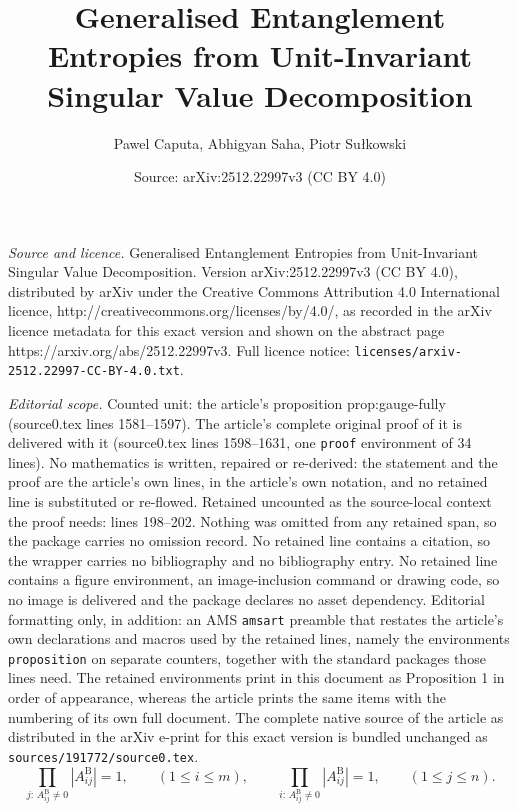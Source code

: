 \documentclass[10pt,a4paper]{amsart}
\title{Generalised Entanglement Entropies from Unit-Invariant Singular Value Decomposition}
\author{Pawel Caputa, Abhigyan Saha, Piotr Su{\l}kowski}
\date{Source: arXiv:2512.22997v3 (CC BY 4.0)}
\begin{document}
\maketitle

\noindent\emph{Source and licence.} Generalised Entanglement Entropies from Unit-Invariant Singular Value Decomposition. Version arXiv:2512.22997v3 (CC BY 4.0), distributed by arXiv under the Creative Commons Attribution 4.0 International licence, http://creativecommons.org/licenses/by/4.0/, as recorded in the arXiv licence metadata for this exact version and shown on the abstract page https://arxiv.org/abs/2512.22997v3. Full licence notice: \texttt{licenses/arxiv-2512.22997-CC-BY-4.0.txt}.\par\smallskip

\noindent\textit{Editorial scope.} Counted unit: the article's proposition prop:gauge-fully (source0.tex lines 1581--1597). The article's complete original proof of it is delivered with it (source0.tex lines 1598--1631, one \texttt{proof} environment of 34 lines). No mathematics is written, repaired or re-derived: the statement and the proof are the article's own lines, in the article's own notation, and no retained line is substituted or re-flowed.  Retained uncounted as the source-local context the proof needs: lines 198--202.  Nothing was omitted from any retained span, so the package carries no omission record.  No retained line contains a citation, so the wrapper carries no bibliography and no bibliography entry.  No retained line contains a figure environment, an image-inclusion command or drawing code, so no image is delivered and the package declares no asset dependency.  Editorial formatting only, in addition: an AMS \texttt{amsart} preamble that restates the article's own declarations and macros used by the retained lines, namely the environments \texttt{proposition} on separate counters, together with the standard packages those lines need.  The retained environments print in this document as Proposition 1 in order of appearance, whereas the article prints the same items with the numbering of its own full document.  The complete native source of the article as distributed in the arXiv e-print for this exact version is bundled unchanged as \texttt{sources/191772/source0.tex}.
\begin{equation}\label{eq:UI-balance}
\prod_{j:\,A^\mathrm{B}_{ij}\neq 0} |A^\mathrm{B}_{ij}|=1,\qquad(1\le i\le m),
\qquad
\prod_{i:\,A^\mathrm{B}_{ij}\neq 0}\!\!\! |A^\mathrm{B}_{ij}|=1,\qquad(1\le j\le n).
\end{equation}
\end{document}

